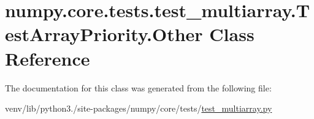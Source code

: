 \hypertarget{classnumpy_1_1core_1_1tests_1_1test__multiarray_1_1TestArrayPriority_1_1Other}{}\section{numpy.\+core.\+tests.\+test\+\_\+multiarray.\+Test\+Array\+Priority.\+Other Class Reference}
\label{classnumpy_1_1core_1_1tests_1_1test__multiarray_1_1TestArrayPriority_1_1Other}


The documentation for this class was generated from the following file\+:\begin{DoxyCompactItemize}
\item 
venv/lib/python3./site-\/packages/numpy/core/tests/\hyperlink{core_2tests_2test__multiarray_8py}{test\+\_\+multiarray.\+py}\end{DoxyCompactItemize}
